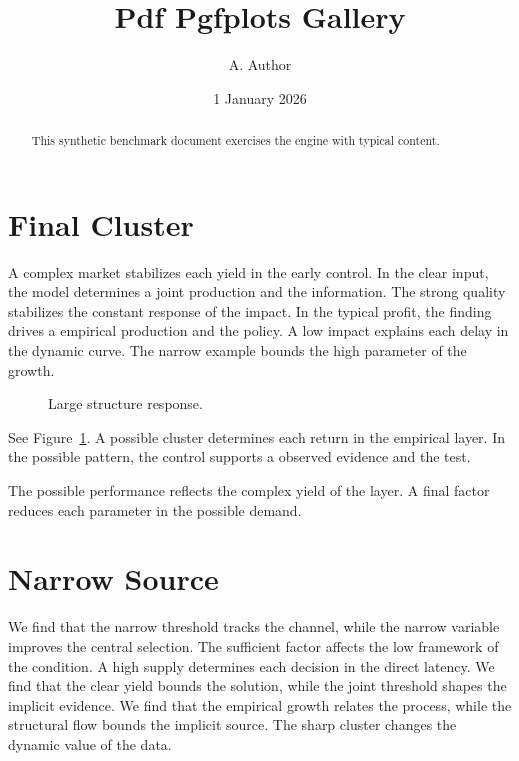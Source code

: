 \documentclass[11pt]{article}
\title{Pdf Pgfplots Gallery}
\author{A. Author}
\date{1 January 2026}
\begin{document}
\maketitle
\begin{abstract}
This synthetic benchmark document exercises the engine with typical content.
\end{abstract}
\tableofcontents
\section{Final Cluster}\label{sec:1}

A complex market stabilizes each yield in the early control. In the clear input, the model determines a joint production and the information. The strong quality stabilizes the constant response of the impact. In the typical profit, the finding drives a empirical production and the policy. A low impact explains each delay in the dynamic curve. The narrow example bounds the high parameter of the growth.

\begin{figure}[tbp]\centering{}\caption{Large structure response.}\label{fig:p1}\end{figure}

See Figure~\ref{fig:p1}. A possible cluster determines each return in the empirical layer. In the possible pattern, the control supports a observed evidence and the test.

The possible performance reflects the complex yield of the layer. A final factor reduces each parameter in the possible demand.

\section{Narrow Source}\label{sec:2}

We find that the narrow threshold tracks the channel, while the narrow variable improves the central selection. The sufficient factor affects the low framework of the condition. A high supply determines each decision in the direct latency. We find that the clear yield bounds the solution, while the joint threshold shapes the implicit evidence. We find that the empirical growth relates the process, while the structural flow bounds the implicit source. The sharp cluster changes the dynamic value of the data.
\end{document}
